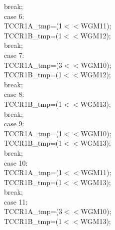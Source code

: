 \documentclass[titlepage, a4paper, 10pt, reqno, openany]{report}
\begin{document}
\begin{minipage}[t]{.35\linewidth}
\hspace*{1.5cm}			break; \\
\hspace*{1cm}		case 6: \\
\hspace*{1.5cm}			TCCR1A\_tmp=(1$<<$WGM11); \\
\hspace*{1.5cm}			TCCR1B\_tmp=(1$<<$WGM12); \\
\hspace*{1.5cm}			break; \\
\hspace*{1cm}		case 7: \\
\hspace*{1.5cm}			TCCR1A\_tmp=(3$<<$WGM10); \\
\hspace*{1.5cm}			TCCR1B\_tmp=(1$<<$WGM12); \\
\hspace*{1.5cm}			break; \\
\hspace*{1cm}		case 8: \\
\hspace*{1.5cm}			TCCR1B\_tmp=(1$<<$WGM13); \\
\hspace*{1.5cm}			break; \\
\hspace*{1cm}		case 9: \\
\hspace*{1.5cm}			TCCR1A\_tmp=(1$<<$WGM10); \\
\hspace*{1.5cm}			TCCR1B\_tmp=(1$<<$WGM13); \\
\hspace*{1.5cm}			break; \\
\hspace*{1cm}		case 10: \\
\hspace*{1.5cm}			TCCR1A\_tmp=(1$<<$WGM11); \\
\hspace*{1.5cm}			TCCR1B\_tmp=(1$<<$WGM13); \\
\hspace*{1.5cm}			break; \\
\hspace*{1cm}		case 11: \\
\hspace*{1.5cm}			TCCR1A\_tmp=(3$<<$WGM10); \\
\hspace*{1.5cm}			TCCR1B\_tmp=(1$<<$WGM13); \\

\end{minipage}
\end{document}
